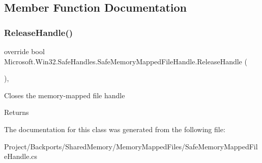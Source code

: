\subsection{Member Function Documentation}
\mbox{\label{class_microsoft_1_1_win32_1_1_safe_handles_1_1_safe_memory_mapped_file_handle_a9644ed711aae6ae944b6a785eb40e59e}} 
\subsubsection{\texorpdfstring{Release\+Handle()}{ReleaseHandle()}}
{\footnotesize\ttfamily override bool Microsoft.\+Win32.\+Safe\+Handles.\+Safe\+Memory\+Mapped\+File\+Handle.\+Release\+Handle (\begin{DoxyParamCaption}{ }\end{DoxyParamCaption})\hspace{0.3cm}{\ttfamily [inline]}, {\ttfamily [protected]}}



Closes the memory-\/mapped file handle 

\begin{DoxyReturn}{Returns}

\end{DoxyReturn}


The documentation for this class was generated from the following file\+:\begin{DoxyCompactItemize}
\item 
Project/\+Backports/\+Shared\+Memory/\+Memory\+Mapped\+Files/Safe\+Memory\+Mapped\+File\+Handle.\+cs\end{DoxyCompactItemize}

